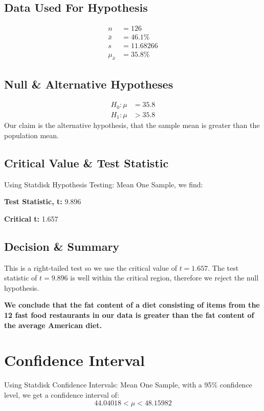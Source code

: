 \documentclass[12pt,fleqn]{article}
\begin{document}
\subsection{Data Used For Hypothesis}
\begin{align*}
  n &= 126 \\
  \bar{x} &= 46.1\% \\
  s &= 11.68266 \\
  \mu_{\bar{x}} &= 35.8\%
\end{align*}

\subsection{Null \& Alternative Hypotheses}
\begin{align*}
  H_0: \mu &= 35.8 \\
  H_1: \mu &> 35.8
\end{align*}
Our claim is the alternative hypothesis, that the sample mean is greater than the population mean.

\subsection{Critical Value \& Test Statistic}
Using Statdisk Hypothesis Testing: Mean One Sample, we find:

\textbf{Test Statistic, t:} 9.896

\textbf{Critical t:} 1.657


\subsection{Decision \& Summary}
This is a right-tailed test so we use the critical value of $t = 1.657$. The test statistic of $t = 9.896$ is well within the critical region, therefore we reject the null hypothesis.

\textbf{We conclude that the fat content of a diet consisting of items from the 12 fast food restaurants in our data is greater than the fat content of the average American diet.}

\section{Confidence Interval}
Using Statdisk Confidence Intervals: Mean One Sample, with a 95\% confidence level, we get a confidence interval of:
\begin{equation*}
  44.04018 < \mu < 48.15982
\end{equation*}
\end{document}

